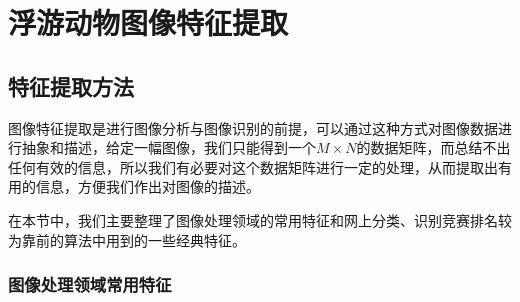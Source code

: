  \chapter{浮游动物图像特征提取}

\section{特征提取方法}
\label{3.1}

图像特征提取是进行图像分析与图像识别的前提，可以通过这种方式对图像数据进行抽象和描述，给定一幅图像，我们只能得到一个$M \times N$的数据矩阵，而总结不出任何有效的信息，所以我们有必要对这个数据矩阵进行一定的处理，从而提取出有用的信息，方便我们作出对图像的描述。

在本节中，我们主要整理了图像处理领域的常用特征和网上分类、识别竞赛排名较为靠前的算法中用到的一些经典特征。

\subsection{图像处理领域常用特征}

